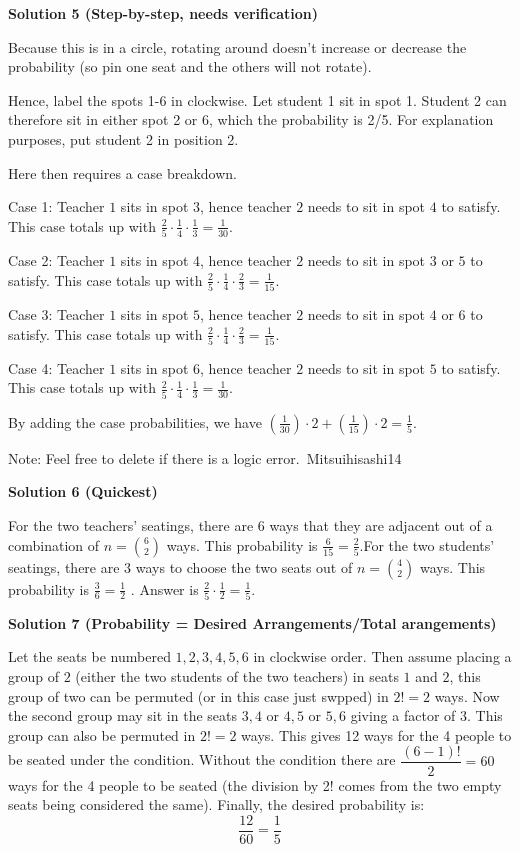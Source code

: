 \begin{enumerate}
\textbf{Solution 5 (Step-by-step, needs verification)}

Because this is in a circle, rotating around doesn't increase or decrease the probability (so pin one seat and the others will not rotate).

 Hence, label the spots 1-6 in clockwise. Let student 1 sit in spot 1. Student 2 can therefore sit in either spot 2 or 6, which the probability is 2/5. For explanation purposes, put student 2 in position 2. 

 Here then requires a case breakdown. 

 Case 1: Teacher $1$ sits in spot $3$, hence teacher $2$ needs to sit in spot $4$ to satisfy. This case totals up with $\frac{2}{5}\cdot \frac{1}{4} \cdot \frac{1}{3} = \frac{1}{30}$.

 Case 2: Teacher $1$ sits in spot $4$, hence teacher $2$ needs to sit in spot $3$ or $5$ to satisfy. This case totals up with $\frac{2}{5} \cdot \frac{1}{4} \cdot \frac{2}{3} = \frac{1}{15}$.

 Case 3: Teacher $1$ sits in spot $5$, hence teacher $2$ needs to sit in spot $4$ or $6$ to satisfy. This case totals up with $\frac{2}{5} \cdot \frac{1}{4} \cdot \frac{2}{3} = \frac{1}{15}$.

 Case 4: Teacher $1$ sits in spot $6$, hence teacher $2$ needs to sit in spot $5$ to satisfy. This case totals up with $\frac{2}{5} \cdot \frac{1}{4} \cdot \frac{1}{3} = \frac{1}{30}$.

 By adding the case probabilities, we have $(\frac{1}{30})\cdot 2 + (\frac{1}{15}) \cdot 2 = \boxed{\frac{1}{5}}$.

 Note: Feel free to delete if there is a logic error.~Mitsuihisashi14

 



\textbf{Solution 6 (Quickest)}

For the two teachers' seatings, there are $6$ ways that they are adjacent out of a combination of $n = \binom{6}{2}$ ways. This probability is $\frac{6}{15} = \frac{2}{5}$.For the two students' seatings, there are $3$ ways to choose the two seats out of $n = \binom{4}{2}$ ways. This probability is $\frac{3}{6} = \frac{1}{2}$ . Answer is $\frac{2}{5} \cdot \frac{1}{2} = \boxed{\frac{1}{5}}$.

 



\textbf{Solution 7 (Probability = Desired Arrangements/Total arangements)}

Let the seats be numbered $1,2,3,4,5,6$ in clockwise order. Then assume placing a group of $2$ (either the two students of the two teachers) in seats $1$ and $2$, this group of two can be permuted (or in this case just swpped) in $2!=2$ ways. Now the second group may sit in the seats $3,4$ or $4,5$ or $5,6$ giving a factor of $3$. This group can also be permuted in $2!=2$ ways. This gives 12 ways for the 4 people to be seated under the condition. Without the condition there are $\dfrac{(6-1)!}{2}=60$ ways for the 4 people to be seated (the division by 2! comes from the two empty seats being considered the same). Finally, the desired probability is:
 \[\frac{12}{60}=\boxed{\frac{1}{5}}\]





\end{enumerate}
